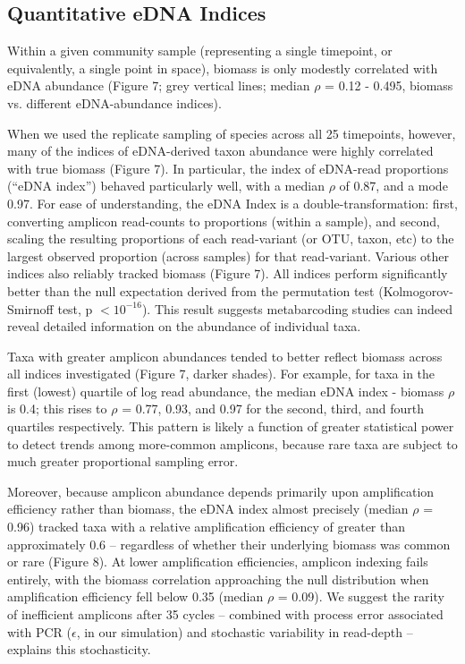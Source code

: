 \documentclass[fleqn,11pt,lineno]{wlscirep}
\begin{document}
\subsection*{Quantitative eDNA Indices}

Within a given community sample (representing a single timepoint, or equivalently, a single point in space), biomass is only modestly correlated with eDNA abundance (Figure 7; grey vertical lines; median $\rho$ = 0.12 - 0.495, biomass vs. different eDNA-abundance indices). 

When we used the replicate sampling of species across all 25 timepoints, however, many of the indices of eDNA-derived taxon abundance were highly correlated with true biomass (Figure 7). In particular, the index of eDNA-read proportions (``eDNA index'') behaved particularly well, with a median $\rho$ of 0.87, and a mode 0.97. For ease of understanding, the eDNA Index is a double-transformation: first, converting amplicon read-counts to proportions (within a sample), and second, scaling the resulting proportions of each read-variant (or OTU, taxon, etc) to the largest observed proportion (across samples) for that read-variant. Various other indices also reliably tracked biomass (Figure 7). All indices perform significantly better than the null expectation derived from the permutation test (Kolmogorov-Smirnoff test, p $< 10^{-16}$). This result suggests metabarcoding studies can indeed reveal detailed information on the abundance of individual taxa. 


Taxa with greater amplicon abundances tended to better reflect biomass across all indices investigated (Figure 7, darker shades). For example, for taxa in the first (lowest) quartile of log read abundance, the median eDNA index - biomass $\rho$ is 0.4; this rises to $\rho$ = 0.77, 0.93, and 0.97 for the second, third, and fourth quartiles respectively. This pattern is likely a function of greater statistical power to detect trends among more-common amplicons, because rare taxa are subject to much greater proportional sampling error. 

Moreover, because amplicon abundance depends primarily upon amplification efficiency rather than biomass, the eDNA index almost precisely (median $\rho$ = 0.96) tracked taxa with a relative amplification efficiency of greater than approximately 0.6 -- regardless of whether their underlying biomass was common or rare (Figure 8). At lower amplification efficiencies, amplicon indexing fails entirely, with the biomass correlation approaching the null distribution when amplification efficiency fell below 0.35 (median  $\rho$ = 0.09). We suggest the rarity of inefficient amplicons after 35 cycles -- combined with process error associated with PCR ($\epsilon$, in our simulation) and stochastic variability in read-depth -- explains this stochasticity. 
\end{document}
